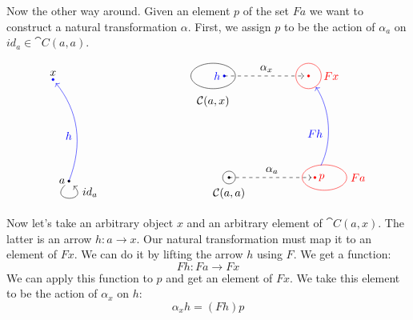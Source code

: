 \documentclass[DaoFP]{subfiles}
\begin{document}
Now the other way around. Given an element $p$ of the set $F a$ we want to construct a natural transformation $\alpha$. First, we assign $p$ to be the action of $\alpha_a$ on $id_a \in \cat C(a, a)$. 

\[
\begin{tikzpicture}
\def\ax{0}
\def\ay{0.5}
\def\xx{-0.5}
\def\xy{3.7}
\filldraw[black] (\ax, \ay) circle (1 pt);
\node (a) at (\ax, \ay) {};
\node[left] at (\ax, \ay) {$a$};
\filldraw[blue] (\xx, \xy) circle (1 pt);
\node[above] at (\xx, \xy) {$x$};

\draw [->] (a) edge[out=225, in=315, loop] (a);
\node[right] at (\ax + 0.3, \ay - 0.35) {$id_a$};

\draw[blue] (\ax, \ay) edge[->, "$h$", bend right, shorten > = 4 pt] (\xx, \xy);

\end{tikzpicture}
\hspace{80pt}
\begin{tikzpicture}

\def\ax{0}
\def\ay{0.5}
\def\xx{-0.5}
\def\xy{3.7}

\def\fax{3}
\def\fay{0.5}
\def\fxx{3 - 0.5}
\def\fxy{3.7}

\def\px{\fax - 0.3}
\def\hx{\xx + 0.35}
\draw[black] (\ax, \ay) circle (0.2);
\filldraw[black] (\ax, \ay) circle (1 pt);
\node[below] at (\ax, \ay-0.2) {$\cat C (a, a)$};
\draw[black] (\xx, \xy) ellipse (0.7 and 0.4);

\filldraw[blue] (\xx + 0.35, \xy) circle (1 pt);
\node[left, blue] at (\hx, \xy) {$h$};

\node[above] at (\xx, \xy - 1.1) {$\cat C (a, x)$};
\draw[dashed] (\hx, \xy) edge[->, "$\alpha_x$", shorten > = 4 pt] (\fxx, \fxy);

\draw[red] (\fax, \fay) ellipse (0.7 and 0.4);
\filldraw[red] (\px, \fay) circle (1 pt);
\node[right, red] at (\px, \fay) {$p$};
\node[right, red] at (\fax + 0.7, \fay) {$F a$};
\draw[dashed] (\ax, \ay) edge[->, "$\alpha_a$", shorten > = 3 pt] (\px, \fay);
\draw[red] (\fxx, \fxy) circle (0.4);
\filldraw[red] (\fxx, \fxy) circle (1 pt);
\node[right, red] at (\fxx + 0.35, \fxy) {$F x$};

\draw[blue] (\px, \fay) edge[->, "$F h$", bend right, shorten > = 12, shorten < = 12] (\fxx, \fxy);

\end{tikzpicture}
\]


Now let's take an arbitrary object $x$ and an arbitrary element of $\cat C(a, x)$. The latter is an arrow $h \colon a \to x$. Our natural transformation must map it to an element of $F x$. We can do it by lifting the arrow $h$ using $F$. We get a function:
\[F h \colon F a \to F x \]
We can apply this function to $p$ and get an element of $F x$. We take this element to be the action of $\alpha_x$ on $h$:
\[ \alpha_x h = (F h) p \]
\end{document}
